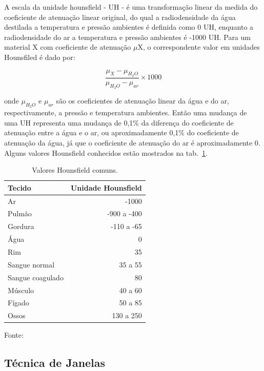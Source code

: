 A escala da unidade hounsfield - UH - é uma transformação linear da medida do coeficiente de atenuação linear original, do qual a radiodensidade da água destilada a temperatura e pressão ambientes é definida como 0 UH, enquanto a radiodensidade do ar a temperatura e pressão ambientes é -1000 UH. Para um material X com coeficiente de atenuação $\mu$X, o correspondente valor em unidades Hounsfiled é dado por:

\begin{equation}
	\frac{\mu_X-\mu_{H_2O}}{\mu_{H_2O}-\mu_{ar}}\times 1000
\end{equation}

onde $\mu_{H_2O}$ e $\mu_{ar}$ são os coeficientes de atenuação linear da água e do ar, respectivamente, a pressão e temperatura ambientes. Então uma mudança de uma UH representa uma mudança de 0,1\% da diferença do coeficiente de atenuação entre a água e o ar, ou aproximadamente 0,1\% do coeficiente de atenuação da água, já que o coeficiente de atenuação do ar é aproximadamente 0. Alguns valores Hounsfield conhecidos estão mostrados na tab.~\ref{tab:hounsfield}.

\begin{table}
 \caption{Valores Hounsfield comuns.}
 \begin{center}
 \begin{tabular}{l|r}
 \hline
 	\textbf{Tecido} & \textbf{Unidade Hounsfield} \\ \hline
 	Ar & -1000 \\
 	Pulmão & -900 a -400 \\
 	Gordura & -110 a -65 \\
 	Água & 0 \\
 	Rim & 35 \\
 	Sangue normal & 35 a 55 \\
 	Sangue coagulado & 80 \\
 	Músculo & 40 a 60 \\
 	Fígado & 50 a 85 \\
 	Ossos & 130 a 250 \\
 \hline
 \end{tabular}
 \end{center}
 \begin{description}
  \item Fonte: \citealt{oliveira}
 \end{description}
 \label{tab:hounsfield}
\end{table}

\subsection{Técnica de Janelas}


